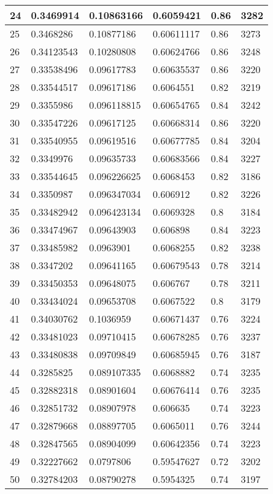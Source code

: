 \begin{longtable}{|l|l|l|l|l|l|}
24 & 0.3469914 & 0.10863166 & 0.6059421 & 0.86 & 3282 \\ \hline 
25 & 0.3468286 & 0.10877186 & 0.60611117 & 0.86 & 3273 \\ \hline 
26 & 0.34123543 & 0.10280808 & 0.60624766 & 0.86 & 3248 \\ \hline 
27 & 0.33538496 & 0.09617783 & 0.60635537 & 0.86 & 3220 \\ \hline 
28 & 0.33544517 & 0.09617186 & 0.6064551 & 0.82 & 3219 \\ \hline 
29 & 0.3355986 & 0.096118815 & 0.60654765 & 0.84 & 3242 \\ \hline 
30 & 0.33547226 & 0.09617125 & 0.60668314 & 0.86 & 3220 \\ \hline 
31 & 0.33540955 & 0.09619516 & 0.60677785 & 0.84 & 3204 \\ \hline 
32 & 0.3349976 & 0.09635733 & 0.60683566 & 0.84 & 3227 \\ \hline 
33 & 0.33544645 & 0.096226625 & 0.6068453 & 0.82 & 3186 \\ \hline 
34 & 0.3350987 & 0.096347034 & 0.606912 & 0.82 & 3226 \\ \hline 
35 & 0.33482942 & 0.096423134 & 0.6069328 & 0.8 & 3184 \\ \hline 
36 & 0.33474967 & 0.09643903 & 0.606898 & 0.84 & 3223 \\ \hline 
37 & 0.33485982 & 0.0963901 & 0.6068255 & 0.82 & 3238 \\ \hline 
38 & 0.3347202 & 0.09641165 & 0.60679543 & 0.78 & 3214 \\ \hline 
39 & 0.33450353 & 0.09648075 & 0.606767 & 0.78 & 3211 \\ \hline 
40 & 0.33434024 & 0.09653708 & 0.6067522 & 0.8 & 3179 \\ \hline 
41 & 0.34030762 & 0.1036959 & 0.60671437 & 0.76 & 3224 \\ \hline 
42 & 0.33481023 & 0.09710415 & 0.60678285 & 0.76 & 3237 \\ \hline 
43 & 0.33480838 & 0.09709849 & 0.60685945 & 0.76 & 3187 \\ \hline 
44 & 0.3285825 & 0.089107335 & 0.6068882 & 0.74 & 3235 \\ \hline 
45 & 0.32882318 & 0.08901604 & 0.60676414 & 0.76 & 3235 \\ \hline 
46 & 0.32851732 & 0.08907978 & 0.606635 & 0.74 & 3223 \\ \hline 
47 & 0.32879668 & 0.08897705 & 0.6065011 & 0.76 & 3244 \\ \hline 
48 & 0.32847565 & 0.08904099 & 0.60642356 & 0.74 & 3223 \\ \hline 
49 & 0.32227662 & 0.0797806 & 0.59547627 & 0.72 & 3202 \\ \hline 
50 & 0.32784203 & 0.08790278 & 0.5954325 & 0.74 & 3197 \\ \hline 
\end{longtable}